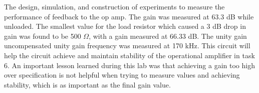 
The design, simulation, and construction of experiments to measure the performance of feedback to the op amp.  The gain was measured at 63.3 dB while unloaded. The smallest value for the load resistor which caused a 3 dB drop in gain was found to be 500 $\Omega$, with a gain measured at 66.33 dB. The unity gain uncompensated unity gain frequency was measured at 170 kHz. This circuit will help the circuit achieve and maintain stability of the operational amplifier in task 6.  An important lesson learned during this lab was that achieving a gain too high over specification is not helpful when trying to measure values and achieving stability, which is as important as the final gain value.



